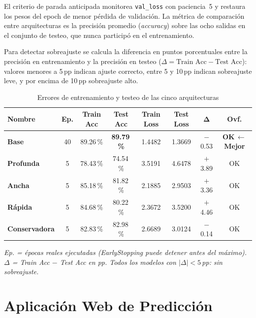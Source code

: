 \documentclass[12pt, a4paper]{report}
\newcommand{\modelo}[1]{\textbf{#1}}
\newcommand{\ingles}[1]{\textit{#1}}
\begin{document}
El criterio de parada anticipada monitorea \texttt{val\_loss} con paciencia~5 y restaura los pesos del epoch de menor pérdida de validación. La métrica de comparación entre arquitecturas es la precisión promedio (\ingles{accuracy}) sobre las ocho salidas en el conjunto de testeo, que nunca participó en el entrenamiento.

Para detectar sobreajuste se calcula la diferencia en puntos porcentuales entre la precisión en entrenamiento y la precisión en testeo ($\Delta = \text{Train Acc} - \text{Test Acc}$): valores menores a 5\,pp indican ajuste correcto, entre 5 y 10\,pp indican sobreajuste leve, y por encima de 10\,pp sobreajuste alto.

\begin{table}[H]
\centering
\caption{Errores de entrenamiento y testeo de las cinco arquitecturas}
\label{tab:resultados}
\begin{tabular}{@{} l c c c c c c c @{}}
\toprule
\textbf{Nombre} & \textbf{Ep.} & \textbf{Train Acc} & \textbf{Test Acc} & \textbf{Train Loss} & \textbf{Test Loss} & $\boldsymbol{\Delta}$ & \textbf{Ovf.} \\
\midrule
\modelo{Base}         & 40 & 89.26\,\% & \textbf{89.79\,\%} & 1.4482 & 1.3669 & $-$0.53 & \textbf{OK\,\color{verde-exito}$\leftarrow$ Mejor} \\
\modelo{Profunda}     & 5  & 78.43\,\% & 74.54\,\% & 3.5191 & 4.6478 & $+$3.89 & OK \\
\modelo{Ancha}        & 5  & 85.18\,\% & 81.82\,\% & 2.1885 & 2.9503 & $+$3.36 & OK \\
\modelo{Rápida}       & 5  & 84.68\,\% & 80.22\,\% & 2.3672 & 3.5200 & $+$4.46 & OK \\
\modelo{Conservadora} & 5  & 82.83\,\% & 82.98\,\% & 2.6689 & 3.0124 & $-$0.14 & OK \\
\bottomrule
\end{tabular}
\end{table}

\noindent\small\textit{Ep. = épocas reales ejecutadas (EarlyStopping puede detener antes del máximo). $\Delta$ = Train Acc $-$ Test Acc en pp. Todos los modelos con $|\Delta| < 5$\,pp: sin sobreajuste.}

\chapter{Aplicación Web de Predicción}
\label{cap:app}
\end{document}
